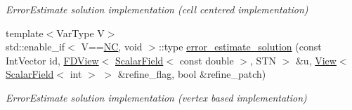 \begin{DoxyCompactItemize}
\begin{DoxyCompactList}\small\item\em Error\+Estimate solution implementation (cell centered implementation) \end{DoxyCompactList}\item 
{\footnotesize template$<$Var\+Type V$>$ }\\std\+::enable\+\_\+if$<$ V==\hyperlink{namespaceUintah_1_1PhaseField_a33d355affda78a83f45755ba8388cedda77924170fe82bfd58b74ca3e44139718}{NC}, void $>$\+::type \hyperlink{classUintah_1_1PhaseField_1_1Heat_a31c25ff9983ce8a001c44c68f78c139c}{error\+\_\+estimate\+\_\+solution} (const Int\+Vector id, \hyperlink{namespaceUintah_1_1PhaseField_a63032464b1cd54eaa53c1c29109746ac}{F\+D\+View}$<$ \hyperlink{structUintah_1_1PhaseField_1_1ScalarField}{Scalar\+Field}$<$ const double $>$, S\+TN $>$ \&u, \hyperlink{namespaceUintah_1_1PhaseField_a59210a1e28eba254d428762c92ddeabb}{View}$<$ \hyperlink{structUintah_1_1PhaseField_1_1ScalarField}{Scalar\+Field}$<$ int $>$ $>$ \&refine\+\_\+flag, bool \&refine\+\_\+patch)
\begin{DoxyCompactList}\small\item\em Error\+Estimate solution implementation (vertex based implementation) \end{DoxyCompactList}\end{DoxyCompactItemize}
